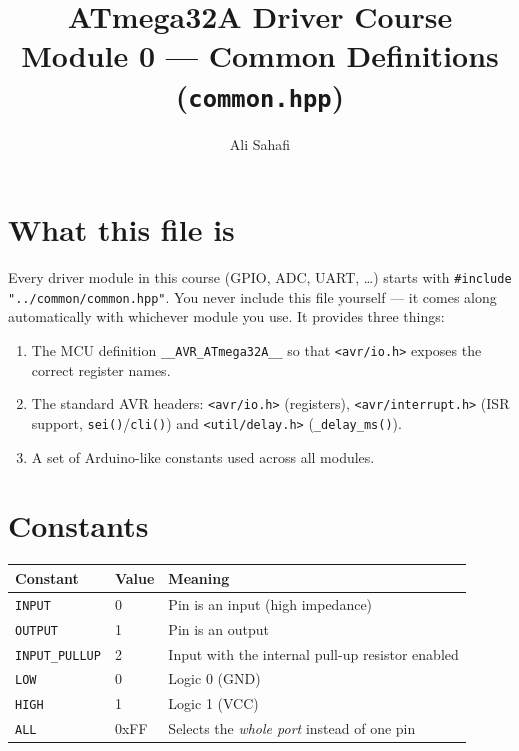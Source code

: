 \documentclass[11pt,a4paper]{article}
\title{ATmega32A Driver Course \\ \Large Module 0 --- Common Definitions (\texttt{common.hpp})}
\author{Ali Sahafi}
\date{}
\begin{document}
\maketitle

\section{What this file is}

Every driver module in this course (GPIO, ADC, UART, \dots) starts with
\lstinline|#include "../common/common.hpp"|. You never include this file
yourself --- it comes along automatically with whichever module you use.
It provides three things:

\begin{enumerate}
  \item The MCU definition \texttt{\_\_AVR\_ATmega32A\_\_} so that
        \texttt{<avr/io.h>} exposes the correct register names.
  \item The standard AVR headers: \texttt{<avr/io.h>} (registers),
        \texttt{<avr/interrupt.h>} (ISR support, \texttt{sei()}/\texttt{cli()}) and
        \texttt{<util/delay.h>} (\texttt{\_delay\_ms()}).
  \item A set of Arduino-like constants used across all modules.
\end{enumerate}

\section{Constants}

\begin{center}
\begin{tabular}{lll}
\toprule
\textbf{Constant} & \textbf{Value} & \textbf{Meaning} \\
\midrule
\texttt{INPUT}        & 0    & Pin is an input (high impedance) \\
\texttt{OUTPUT}       & 1    & Pin is an output \\
\texttt{INPUT\_PULLUP} & 2    & Input with the internal pull-up resistor enabled \\
\texttt{LOW}          & 0    & Logic 0 (GND) \\
\texttt{HIGH}         & 1    & Logic 1 (VCC) \\
\texttt{ALL}          & 0xFF & Selects the \emph{whole port} instead of one pin \\
\bottomrule
\end{tabular}
\end{center}
\end{document}
